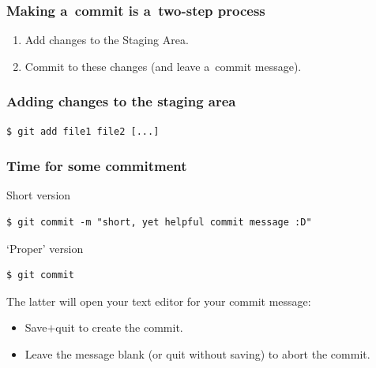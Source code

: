 \documentclass[12pt]{beamer}
\begin{document}
\begin{frame}
  \frametitle{Making a~commit is a~two-step process}

  \begin{enumerate}
    \item\alert{Add} changes to the Staging Area.
    \item\alert{Commit} to these changes (and leave a~commit message).
  \end{enumerate}
\end{frame}

\begin{frame}[fragile]
  \frametitle{Adding changes to the staging area}

  {\footnotesize{}%
    \begin{verbatim}
$ git add file1 file2 [...]
    \end{verbatim}%
  }
\end{frame}

\begin{frame}[fragile]
  \frametitle{Time for some commitment}

  \begin{block}{Short version}
    {\footnotesize{}%
      \begin{verbatim}
$ git commit -m "short, yet helpful commit message :D"
      \end{verbatim}%
    }
  \end{block}

  \begin{block}{`Proper' version}
    {\footnotesize{}%
      \begin{verbatim}
$ git commit
      \end{verbatim}%
    }
  \end{block}

  The latter will open your text editor for your commit message:
  \begin{itemize}
    \item Save$+$quit to create the commit.
    \item Leave the message blank (or quit without saving) to abort the commit.
  \end{itemize}
\end{frame}
\end{document}

